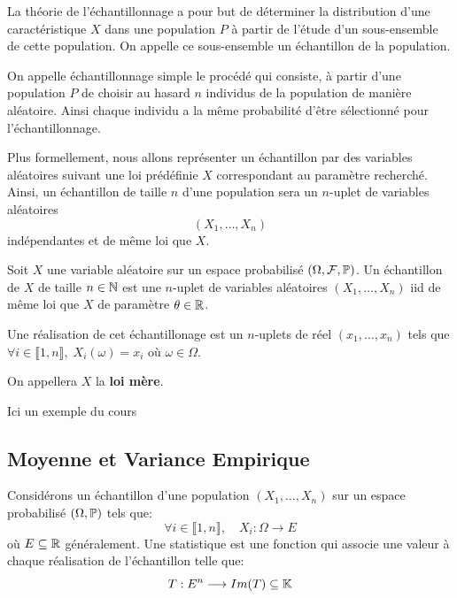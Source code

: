 La théorie de l'échantillonnage a pour but de déterminer la distribution d'une caractéristique $X$ dans une 
population $P$ à partir de l'étude d'un sous-ensemble de cette population. On appelle ce sous-ensemble un 
échantillon de la population. 

\begin{definition}
    On appelle échantillonnage simple le procédé qui consiste, à partir d'une population $P$ de 
    choisir au hasard $n$ individus de la population de manière aléatoire. 
    Ainsi chaque individu a la même probabilité d'être sélectionné pour l'échantillonnage. 
\end{definition}

Plus formellement, nous allons représenter un échantillon par des variables aléatoires suivant une 
loi prédéfinie $X$ correspondant au paramètre recherché. Ainsi, un échantillon de taille $n$ d'une population sera un $n$-uplet de variables aléatoires 
    \[ (X_1, \dots, X_n) \]
indépendantes et de même loi que $X$. 

\begin{definition}
    Soit $X$ une variable aléatoire sur un espace probabilisé $(\Omega, \mathcal{F}, \mathbb{P})$. 
    Un échantillon de $X$ de taille $n \in \mathbb{N}$ est une $n$-uplet de variables aléatoires 
    $(X_1, \dots, X_n)$ iid de même loi que $X$ de paramètre $\theta \in \mathbb{R}$. 

    \vspace{0.3cm}

    Une réalisation de cet échantillonage est un $n$-uplets de réel $(x_1, \dots, x_n)$ tels que 
    $ \forall i \in \llbracket 1, n \rrbracket, \; X_i(\omega) = x_i$ où $ \omega \in \Omega$. 
\end{definition}

\begin{remark}
    On appellera $X$ la \textbf{loi mère}. 
\end{remark}

\begin{example}
    Ici un exemple du cours
\end{example}

\subsection{Moyenne et Variance Empirique}

\begin{definition}[Statistique]
    Considérons un échantillon d'une population $(X_1, \dots, X_n)$ sur un espace probabilisé 
    $(\Omega, \mathbb{P} )$ tels que: 
        \[ \forall i \in \llbracket 1, n \rrbracket, \quad X_i : \Omega \longrightarrow E \]
    où $E \subseteq \mathbb{R}$ généralement.  
    Une statistique est une fonction qui associe une valeur à chaque réalisation de l'échantillon telle que: 
        \[ T : E^n \longrightarrow Im(T) \subseteq \mathbb{K} \] 
\end{definition}

